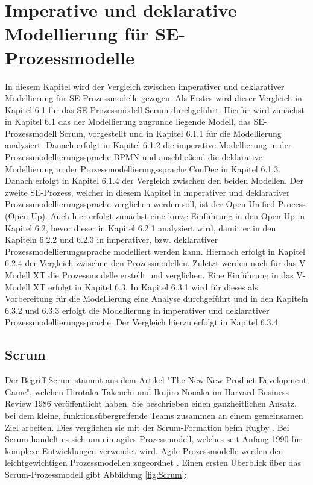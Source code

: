 \chapter{Imperative und deklarative Modellierung für SE-Prozessmodelle}\label{sec:chapter6}
In diesem Kapitel wird der Vergleich zwischen imperativer und deklarativer Modellierung für SE-Prozessmodelle gezogen. Als Erstes wird dieser Vergleich in Kapitel 6.1 für das SE-Prozessmodell Scrum durchgeführt. Hierfür wird zunächst in Kapitel 6.1 das der Modellierung zugrunde liegende Modell, das SE-Prozessmodell Scrum, vorgestellt und in Kapitel 6.1.1 für die Modellierung analysiert. Danach erfolgt in Kapitel 6.1.2 die imperative Modellierung in der Prozessmodellierungssprache BPMN und anschließend die deklarative Modellierung in der Prozessmodellierungssprache ConDec in Kapitel 6.1.3. Danach erfolgt  in Kapitel 6.1.4 der Vergleich zwischen den beiden Modellen.\newline
Der zweite SE-Prozess, welcher in diesem Kapitel in imperativer und deklarativer Prozessmodellierungssprache verglichen werden soll, ist der Open Unified Process (Open Up). Auch hier erfolgt zunächst eine kurze Einführung in den Open Up in Kapitel 6.2, bevor dieser in Kapitel 6.2.1 analysiert wird, damit er in den Kapiteln 6.2.2 und 6.2.3 in imperativer, bzw. deklarativer Prozessmodellierungssprache modelliert werden kann. Hiernach erfolgt in Kapitel 6.2.4 der Vergleich zwischen den Prozessmodellen.\newline
Zuletzt werden noch für das V-Modell XT die Prozessmodelle erstellt und verglichen. Eine Einführung in das V-Modell XT erfolgt in Kapitel 6.3. In Kapitel 6.3.1 wird für dieses als Vorbereitung für die Modellierung eine Analyse durchgeführt und in den Kapiteln 6.3.2 und 6.3.3 erfolgt die Modellierung in imperativer und deklarativer Prozessmodellierungssprache. Der Vergleich hierzu erfolgt in Kapitel 6.3.4.


\section{Scrum}\label{sec:chapter6:Imperative Modellierung}

Der Begriff Scrum stammt aus dem Artikel "The New New Product Development Game", welchen Hirotaka Takeuchi und Ikujiro Nonaka im Harvard Business Review 1986 veröffentlicht haben. Sie beschrieben einen ganzheitlichen Ansatz, bei dem kleine, funktionsübergreifende Teams zusammen an einem gemeinsamen Ziel arbeiten. Dies verglichen sie mit der Scrum-Formation beim Rugby \cite{Pham2012,Takeuchi1986}. \newline
Bei Scrum handelt es sich um ein agiles Prozessmodell, welches seit Anfang 1990 für komplexe Entwicklungen verwendet wird. Agile Prozessmodelle werden den leichtgewichtigen Prozessmodellen zugeordnet \cite{Hanser2010, Lacey2012}. Einen ersten Überblick über das Scrum-Prozessmodell gibt Abbildung \ref{fig:Scrum}:

